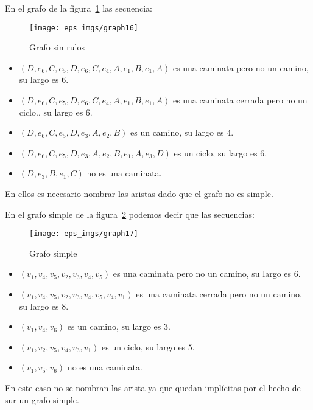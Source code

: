 \begin{ejemplo}
En el grafo de la figura~\ref{fig:graph16-b} las secuencia:
\begin{figure}[h!]
\centering
\texttt{[image: eps\_imgs/graph16]}
\caption{Grafo sin rulos}
\label{fig:graph16-b}
\end{figure}
\begin{itemize} 
  \itemsep 0pt
  \item $(D,e_6,C,e_5,D,e_6,C,e_4,A,e_1,B,e_1,A)$ es una caminata pero no un camino, su largo es 6.
  \item $(D,e_6,C,e_5,D,e_6,C,e_4,A,e_1,B,e_1,A)$ es una caminata cerrada pero no un ciclo., su largo es 6.
  \item $(D,e_6,C,e_5,D,e_3,A,e_2,B)$ es un camino, su largo es $4$.
  \item $(D,e_6,C,e_5,D,e_3,A,e_2,B,e_1,A,e_3,D)$ es un ciclo, su largo es $6$.
  \item $(D,e_3,B,e_1,C)$ no es una caminata.
\end{itemize}
En ellos es necesario nombrar las aristas dado que el grafo no es simple.

En el grafo simple de la figura~\ref{fig:graph17} podemos decir que las secuencias:
\begin{figure}[h!]
\centering
\texttt{[image: eps\_imgs/graph17]}
\caption{Grafo simple}
\label{fig:graph17}
\end{figure}
\begin{itemize}
  \itemsep 0pt
  \item $(v_1,v_4,v_5,v_2,v_3,v_4,v_5)$ es una caminata pero no un camino, su largo es $6$.
  \item $(v_1,v_4,v_5,v_2,v_3,v_4,v_5,v_4,v_1)$ es una caminata cerrada pero no un camino, su largo es $8$.
  \item $(v_1,v_4,v_6)$ es un camino, su largo es $3$.
  \item $(v_1,v_2,v_5,v_4,v_3,v_1)$ es un ciclo, su largo es $5$.
  \item $(v_1,v_5,v_6)$ no es una caminata.
\end{itemize}
En este caso no se nombran las arista ya que quedan implícitas por el hecho de sur un grafo simple.
\end{ejemplo}

